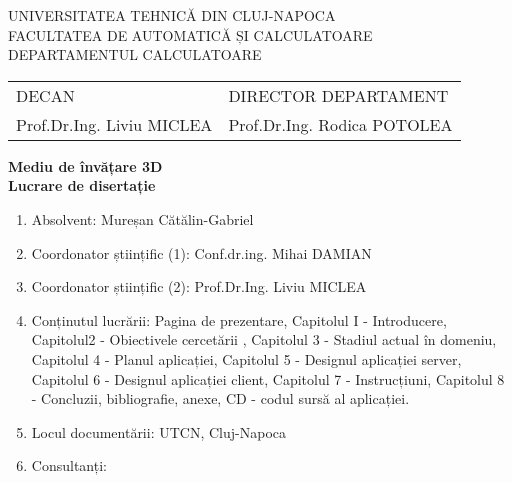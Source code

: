 \documentclass[12pt,a4paper,twoside]{report}
\begin{document}
\begin{titlepage}

\begin{center}
UNIVERSITATEA TEHNICĂ DIN CLUJ-NAPOCA\\
FACULTATEA DE AUTOMATICĂ ȘI CALCULATOARE\\
DEPARTAMENTUL CALCULATOARE\\

\vspace{1cm}

%
\begin{tabularx}{\textwidth}{lR}
DECAN & DIRECTOR DEPARTAMENT \\
Prof.Dr.Ing. Liviu MICLEA & Prof.Dr.Ing. Rodica POTOLEA\\
\end{tabularx}

\vspace {3cm}

\Huge \textbf{Mediu de învățare 3D}\\
\vspace {1cm}
\Large \textbf{Lucrare de disertație}\\
\vspace{1cm}

\end{center}


\begin{flushleft}
\begin{enumerate}
 \item Absolvent: Mureșan Cătălin-Gabriel

 \item Coordonator științific (1): Conf.dr.ing. Mihai DAMIAN\\
 \item Coordonator științific (2): Prof.Dr.Ing. Liviu MICLEA
 \item Conținutul lucrării: Pagina de prezentare, Capitolul I - Introducere, Capitolul2 - Obiectivele cercetării ,  Capitolul 3 - Stadiul actual în domeniu, Capitolul 4 - Planul aplicației, Capitolul 5 - Designul aplicației server, Capitolul 6 - Designul aplicației client, Capitolul 7 - Instrucțiuni, Capitolul 8 - Concluzii, bibliografie, anexe, CD - codul sursă al aplicației.

 \item Locul documentării: UTCN, Cluj-Napoca

 \item Consultanți: \dotfill


\end{enumerate}
\end{flushleft}
\end{titlepage}
\end{document}
